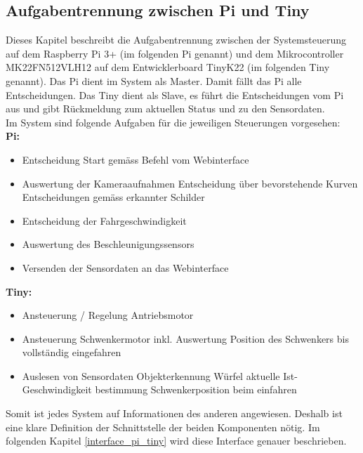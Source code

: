 \documentclass[../../main.tex]{subfiles}
\begin{document}
    \subsection{Aufgabentrennung zwischen Pi und Tiny} \label{aufgabentrennung_pi_tiny}
    Dieses Kapitel beschreibt die Aufgabentrennung zwischen der Systemsteuerung auf dem Raspberry Pi 3+ (im folgenden Pi genannt) und dem Mikrocontroller MK22FN512VLH12 auf dem Entwicklerboard TinyK22 (im folgenden Tiny genannt). Das Pi dient im System als Master. Damit fällt das Pi alle Entscheidungen. Das Tiny dient als Slave, es führt die Entscheidungen vom Pi aus und gibt Rückmeldung zum aktuellen Status und zu den Sensordaten.\\
    Im System sind folgende Aufgaben für die jeweiligen Steuerungen vorgesehen:\\
    \textbf{Pi:}
    \begin{itemize}
        \item Entscheidung Start gemäss Befehl vom Webinterface
        \item Auswertung der Kameraaufnahmen
            \subitem Entscheidung über bevorstehende Kurven
            \subitem Entscheidungen gemäss erkannter Schilder
        \item Entscheidung der Fahrgeschwindigkeit
        \item Auswertung des Beschleunigungssensors
        \item Versenden der Sensordaten an das Webinterface
    \end{itemize}

    \textbf{Tiny:}
    \begin{itemize}
        \item Ansteuerung / Regelung Antriebsmotor
        \item Ansteuerung Schwenkermotor
            \subitem inkl. Auswertung Position des Schwenkers bis vollständig eingefahren
        \item Auslesen von Sensordaten
            \subitem Objekterkennung Würfel
            \subitem aktuelle Ist-Geschwindigkeit
            \subitem bestimmung Schwenkerposition beim einfahren
    \end{itemize}

    Somit ist jedes System auf Informationen des anderen angewiesen. Deshalb ist eine klare Definition der Schnittstelle der beiden Komponenten nötig. Im folgenden Kapitel \ref{interface_pi_tiny} wird diese Interface genauer beschrieben.

    \pagebreak
\end{document}
